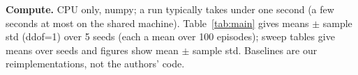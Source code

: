 \textbf{Compute.} CPU only, numpy; a run typically takes under one second (a few seconds at most on the shared machine). Table~\ref{tab:main} gives means $\pm$ sample std (ddof=1) over 5 seeds (each a mean over 100 episodes); sweep tables give means over seeds and figures show mean $\pm$ sample std. Baselines are our reimplementations, not the authors' code.
